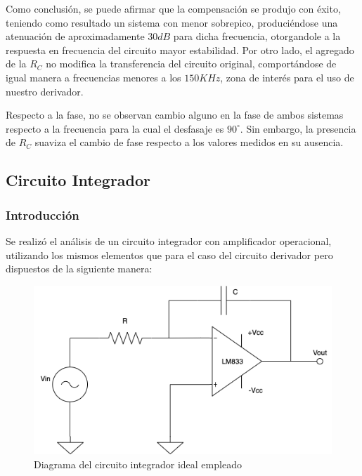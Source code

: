 Como conclusión, se puede afirmar que la compensación se produjo con éxito, teniendo como 
resultado un sistema con menor sobrepico, produciéndose una atenuación de aproximadamente
$30dB$ para dicha frecuencia, otorgandole a la respuesta en frecuencia del circuito mayor 
estabilidad. Por otro lado, el agregado 
de la $R_C$ no modifica la transferencia del circuito original, comportándose de igual manera 
a frecuencias menores a los $150KHz$, zona de interés para el uso de nuestro derivador. \par 
Respecto a la fase, no se observan cambio alguno en la fase de ambos sistemas respecto a la frecuencia para 
la cual el desfasaje es $90^\circ$. Sin embargo, la presencia de $R_C$ suaviza el cambio de fase respecto a los
valores medidos en su ausencia.







\subsection{Circuito Integrador}

\subsubsection{Introducción}

Se realizó el análisis de un circuito integrador con amplificador operacional, utilizando los mismos elementos
que para el caso del circuito derivador pero dispuestos de la siguiente manera:

\begin{figure}[H]
    \centering 
    \includegraphics [scale=0.5] {../Ejercicio3-CircuitoIntegradoresyDerivadores/Imagenes/diagrama-integrador.png} 
    \caption{Diagrama del circuito integrador ideal empleado}
    \label{fig:emptyPlotTool}
\end{figure}

